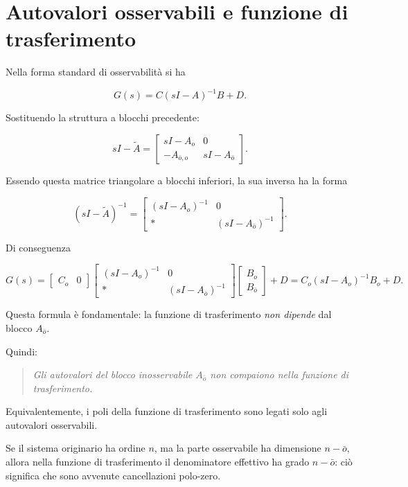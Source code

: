 \section{Autovalori osservabili e funzione di trasferimento}

Nella forma standard di osservabilità si ha

\[
G(s)=C(sI-A)^{-1}B + D.
\]

Sostituendo la struttura a blocchi precedente:

\[
sI-\tilde A=
\begin{bmatrix}
sI-A_o & 0 \\
-A_{\bar o,o} & sI-A_{\bar o}
\end{bmatrix}.
\]

Essendo questa matrice triangolare a blocchi inferiori, la sua inversa ha la forma

\[
(sI-\tilde A)^{-1}
=
\begin{bmatrix}
(sI-A_o)^{-1} & 0 \\
\ast & (sI-A_{\bar o})^{-1}
\end{bmatrix}.
\]

Di conseguenza

\[
G(s)
=
\begin{bmatrix}
C_o & 0
\end{bmatrix}
\begin{bmatrix}
(sI-A_o)^{-1} & 0 \\
\ast & (sI-A_{\bar o})^{-1}
\end{bmatrix}
\begin{bmatrix}
B_o \\ B_{\bar o}
\end{bmatrix}
+ D
=
C_o(sI-A_o)^{-1}B_o + D.
\]

Questa formula è fondamentale: la funzione di trasferimento \emph{non dipende} dal blocco \(A_{\bar o}\).

\medskip

Quindi:

\begin{quote}
\emph{Gli autovalori del blocco inosservabile \(A_{\bar o}\) non compaiono nella funzione di trasferimento.}
\end{quote}

Equivalentemente, i poli della funzione di trasferimento sono legati solo agli autovalori osservabili.

\medskip

Se il sistema originario ha ordine \(n\), ma la parte osservabile ha dimensione \(n-\bar o\), allora nella funzione di trasferimento il denominatore effettivo ha grado \(n-\bar o\): ciò significa che sono avvenute cancellazioni polo-zero.

